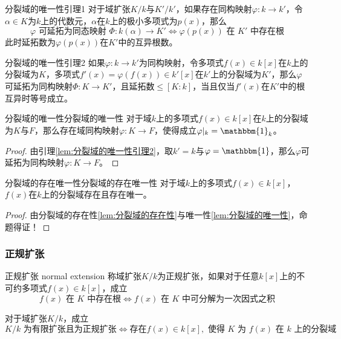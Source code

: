 \begin{lemma}{}{分裂域的唯一性引理1}
	对于域扩张$K/k$与$K'/k'$，如果存在同构映射$\varphi:k\to k'$，令$\alpha\in K$为$k$上的代数元，$\alpha$在$k$上的极小多项式为$p(x)$，那么%
	$$
	\varphi\text{ 可延拓为同态映射 }\Phi:k(\alpha)\to K'\iff
	\varphi(p(x))\text{ 在 }K'\text{ 中存在根}
	$$
	此时延拓数为$\varphi(p(x))$在$K'$中的互异根数。
\end{lemma}

\begin{lemma}{}{分裂域的唯一性引理2}
	如果$\varphi:k\to k'$为同构映射，令多项式$f(x)\in k[x]$在$k$上的分裂域为$K$，多项式$f'(x)=\varphi(f(x))\in k'[x]$在$k'$上的分裂域为$K'$，那么$\varphi$可延拓为同构映射$\Phi:K\to K'$，且延拓数$\le [K:k]$，当且仅当$f'(x)$在$K'$中的根互异时等号成立。
\end{lemma}

\begin{lemma}{分裂域的唯一性}{分裂域的唯一性}
	对于域$k$上的多项式$f(x)\in k[x]$在$k$上的分裂域为$K$与$F$，那么存在域同构映射$\varphi:K\to F$，使得成立$\varphi|_k=\mathbbm{1}_k$。
\end{lemma}

\begin{proof}
	由引理\ref{lem:分裂域的唯一性引理2}，取$k'=k$与$\varphi=\mathbbm{1}$，那么$\varphi$可延拓为同构映射$\varphi:K\to F$。
\end{proof}

\begin{theorem}{分裂域的存在唯一性}{分裂域的存在唯一性}
	对于域$k$上的多项式$f(x)\in k[x]$，$f(x)$在$k$上的分裂域存在且存在唯一。
\end{theorem}

\begin{proof}
	由分裂域的存在性\ref{lem:分裂域的存在性}与唯一性\ref{lem:分裂域的唯一性}，命题得证！
\end{proof}

\subsubsection{正规扩张}

\begin{definition}{正规扩张 normal extension}
	称域扩张$K/k$为正规扩张，如果对于任意$k[x]$上的不可约多项式$f(x)\in k[x]$，成立%
	$$
	f(x)\text{ 在 }K\text{ 中存在根}
	\iff
	f(x)\text{ 在 }K\text{ 中可分解为一次因式之积}
	$$
\end{definition}

\begin{theorem}
	对于域扩张$K/k$，成立%
	$$
	K/k\text{ 为有限扩张且为正规扩张}
	\iff
	\text{存在}f(x)\in k[x],\text{ 使得 }K\text{ 为 }f(x)\text{ 在 }k\text{ 上的分裂域}
	$$
\end{theorem}

